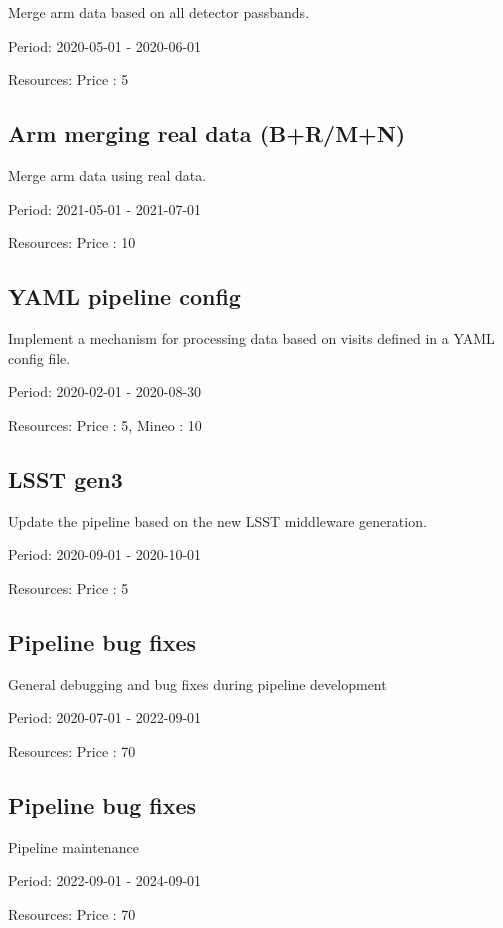 Merge arm data based on all detector passbands.

Period: 2020-05-01 - 2020-06-01

Resources: Price : 5

\subsection{Arm merging real data (B+R/M+N)}

Merge arm data using real data.

Period: 2021-05-01 - 2021-07-01

Resources: Price : 10

\subsection{YAML pipeline config}

Implement a mechanism for processing data based on visits defined in a YAML config file.

Period: 2020-02-01 - 2020-08-30

Resources: Price : 5, Mineo : 10

\subsection{LSST gen3}

Update the pipeline based on the new LSST middleware generation.

Period: 2020-09-01 - 2020-10-01

Resources: Price : 5

\subsection{Pipeline bug fixes}

General debugging and bug fixes during pipeline development

Period: 2020-07-01 - 2022-09-01

Resources: Price : 70

\subsection{Pipeline bug fixes}

Pipeline maintenance

Period: 2022-09-01 - 2024-09-01

Resources: Price : 70

